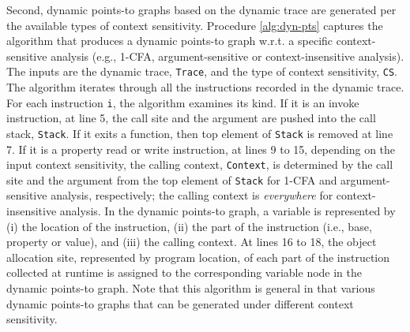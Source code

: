 Second, dynamic points-to graphs based on the dynamic trace are generated per the available types of context sensitivity. Procedure \ref{alg:dyn-pts} captures the algorithm that produces a dynamic points-to graph w.r.t. a specific context-sensitive analysis (e.g., 1-CFA, argument-sensitive or context-insensitive analysis). The inputs are the dynamic trace, {\tt Trace}, and the type of context sensitivity, {\tt CS}. The algorithm iterates through all the instructions recorded in the dynamic trace. For each instruction {\tt i}, the algorithm examines its kind. If it is an invoke instruction, at line 5, the call site and the argument are pushed into the call stack, {\tt Stack}. If it exits a function, then top element of {\tt Stack} is removed  at line 7. If it is a property read or write instruction, at lines 9 to 15, depending on the input context sensitivity, the calling context, {\tt Context}, is determined by the call site and the argument from the top element of {\tt Stack} for 1-CFA and argument-sensitive analysis, respectively; the calling context is {\it everywhere} for context-insensitive analysis. In the dynamic points-to graph, a variable is represented by (i) the location of the instruction, (ii) the part of the instruction (i.e., base, property or value), and (iii) the calling context. At lines 16 to 18, the object allocation site, represented by program location, of each part of the instruction collected at runtime is assigned to the corresponding variable node in the dynamic points-to graph. Note that this algorithm is general in that various dynamic points-to graphs that can be generated under different context sensitivity.

\newcommand{\SWITCH}[1]{\STATE \textbf{switch} (#1) \begin{ALC@g}}
\newcommand{\ENDSWITCH}{\end{ALC@g} \STATE \textbf{end switch}}
\newcommand{\CASE}[1]{\STATE \textbf{case} #1\textbf{:} \begin{ALC@g}}
\newcommand{\ENDCASE}{\end{ALC@g}}
\newcommand{\CASELINE}[1]{\STATE \textbf{case} #1\textbf{:} \begin{ALC@g}}
\newcommand{\DEFAULT}{\STATE \textbf{default:} \begin{ALC@g}}
\newcommand{\ENDDEFAULT}{\end{ALC@g}}
\newcommand{\DEFAULTLINE}[1]{\STATE \textbf{default:} }

